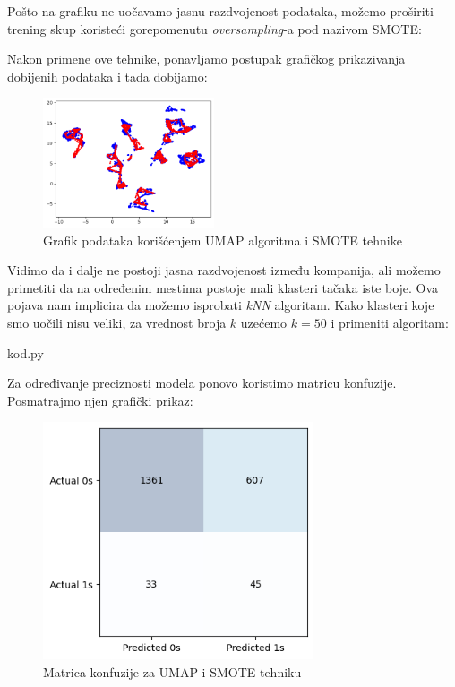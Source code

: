 \documentclass[12pt]{article}
\theoremstyle{definition}
\theoremstyle{remark}
\begin{document}
Pošto na grafiku ne uočavamo jasnu razdvojenost podataka, možemo proširiti trening skup koristeći gorepomenutu \emph{oversampling}-a pod nazivom SMOTE:

\hfill


\hfill

Nakon primene ove tehnike, ponavljamo postupak grafičkog prikazivanja dobijenih podataka i tada dobijamo:



\begin{figure}[htp]
    \centering
    \includegraphics[width=0.45\textwidth]{output_46_0.png}
    \caption{Grafik podataka korišćenjem UMAP algoritma i SMOTE tehnike}
    \label{fig:galaxy}
\end{figure}

Vidimo da i dalje ne postoji jasna razdvojenost između kompanija, ali možemo primetiti da na određenim mestima postoje mali klasteri tačaka iste boje. Ova pojava nam implicira da možemo isprobati \emph{kNN} algoritam. Kako klasteri koje smo uočili nisu veliki, za vrednost broja $k$ uzećemo $k=50$ i primeniti algoritam:

\hfill

{kod.py}

\hfill

Za određivanje preciznosti modela ponovo koristimo matricu konfuzije. Posmatrajmo njen grafički prikaz:

\begin{figure}[htp]
    \centering
    \includegraphics[width=8cm]{output_48_0.png}
    \caption{Matrica konfuzije za UMAP i SMOTE tehniku}
    \label{fig:galaxy}
\end{figure}
\end{document}
